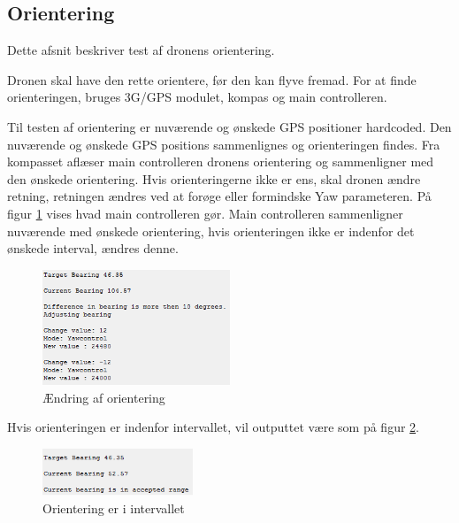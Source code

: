 \subsection{Orientering}

Dette afsnit beskriver test af dronens orientering. 

Dronen skal have den rette orientere, før den kan flyve fremad. For at finde orienteringen, bruges 3G/GPS modulet, kompas og main controlleren.

Til testen af orientering er nuværende og ønskede GPS positioner hardcoded. 
Den nuværende og ønskede GPS positions sammenlignes og orienteringen findes. Fra kompasset aflæser main controlleren dronens orientering og sammenligner med den ønskede orientering. Hvis orienteringerne ikke er ens, skal dronen ændre retning, retningen ændres ved at forøge eller formindske Yaw parameteren. 
På figur \ref{fig:orientering_skift} vises hvad main controlleren gør. Main controlleren sammenligner nuværende med ønskede orientering, hvis orienteringen ikke er indenfor det ønskede interval, ændres denne.

\begin{figure}[H]
\centering
\includegraphics[width=0.5\textwidth]{Billeder/Test/bearing_test.png}
\caption{Ændring af orientering}
\label{fig:orientering_skift}
\end{figure}

Hvis orienteringen er indenfor intervallet, vil outputtet være som på figur \ref{fig:orientering_interval}.

\begin{figure}[H]
\centering
\includegraphics[width=0.4\textwidth]{Billeder/Test/bearing_reached.png}
\caption{Orientering er i intervallet}
\label{fig:orientering_interval}
\end{figure}